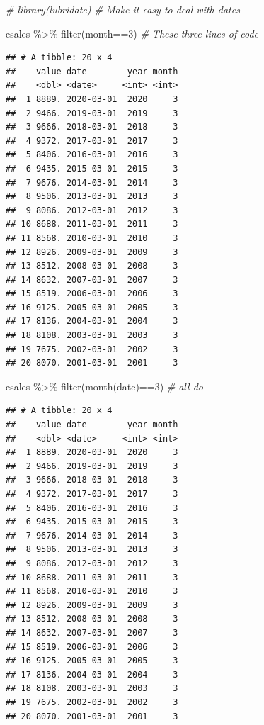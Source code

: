 \documentclass[
]{book}
\newenvironment{Shaded}{\begin{snugshade}}{\end{snugshade}}
\newcommand{\CommentTok}[1]{\textcolor[rgb]{0.56,0.35,0.01}{\textit{#1}}}
\newcommand{\DecValTok}[1]{\textcolor[rgb]{0.00,0.00,0.81}{#1}}
\newcommand{\FunctionTok}[1]{\textcolor[rgb]{0.00,0.00,0.00}{#1}}
\newcommand{\NormalTok}[1]{#1}
\newcommand{\SpecialCharTok}[1]{\textcolor[rgb]{0.00,0.00,0.00}{#1}}
\begin{document}
\begin{Shaded}
\begin{Highlighting}[]
\CommentTok{\# library(lubridate) \# Make it easy to deal with dates}

\NormalTok{esales }\SpecialCharTok{\%\textgreater{}\%} \FunctionTok{filter}\NormalTok{(month}\SpecialCharTok{==}\DecValTok{3}\NormalTok{)                   }\CommentTok{\# These three lines of code}
\end{Highlighting}
\end{Shaded}

\begin{verbatim}
## # A tibble: 20 x 4
##    value date        year month
##    <dbl> <date>     <int> <int>
##  1 8889. 2020-03-01  2020     3
##  2 9466. 2019-03-01  2019     3
##  3 9666. 2018-03-01  2018     3
##  4 9372. 2017-03-01  2017     3
##  5 8406. 2016-03-01  2016     3
##  6 9435. 2015-03-01  2015     3
##  7 9676. 2014-03-01  2014     3
##  8 9506. 2013-03-01  2013     3
##  9 8086. 2012-03-01  2012     3
## 10 8688. 2011-03-01  2011     3
## 11 8568. 2010-03-01  2010     3
## 12 8926. 2009-03-01  2009     3
## 13 8512. 2008-03-01  2008     3
## 14 8632. 2007-03-01  2007     3
## 15 8519. 2006-03-01  2006     3
## 16 9125. 2005-03-01  2005     3
## 17 8136. 2004-03-01  2004     3
## 18 8108. 2003-03-01  2003     3
## 19 7675. 2002-03-01  2002     3
## 20 8070. 2001-03-01  2001     3
\end{verbatim}

\begin{Shaded}
\begin{Highlighting}[]
\NormalTok{esales }\SpecialCharTok{\%\textgreater{}\%} \FunctionTok{filter}\NormalTok{(}\FunctionTok{month}\NormalTok{(date)}\SpecialCharTok{==}\DecValTok{3}\NormalTok{)             }\CommentTok{\#   all do}
\end{Highlighting}
\end{Shaded}

\begin{verbatim}
## # A tibble: 20 x 4
##    value date        year month
##    <dbl> <date>     <int> <int>
##  1 8889. 2020-03-01  2020     3
##  2 9466. 2019-03-01  2019     3
##  3 9666. 2018-03-01  2018     3
##  4 9372. 2017-03-01  2017     3
##  5 8406. 2016-03-01  2016     3
##  6 9435. 2015-03-01  2015     3
##  7 9676. 2014-03-01  2014     3
##  8 9506. 2013-03-01  2013     3
##  9 8086. 2012-03-01  2012     3
## 10 8688. 2011-03-01  2011     3
## 11 8568. 2010-03-01  2010     3
## 12 8926. 2009-03-01  2009     3
## 13 8512. 2008-03-01  2008     3
## 14 8632. 2007-03-01  2007     3
## 15 8519. 2006-03-01  2006     3
## 16 9125. 2005-03-01  2005     3
## 17 8136. 2004-03-01  2004     3
## 18 8108. 2003-03-01  2003     3
## 19 7675. 2002-03-01  2002     3
## 20 8070. 2001-03-01  2001     3
\end{verbatim}
\end{document}
